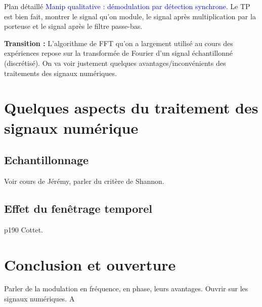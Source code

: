 \begin{reportBlock}{Plan détaillé}
\textcolor{blue}{Manip qualitative : démodulation par détection synchrone}. Le TP est bien fait, montrer le signal qu'on module, le signal après multiplication par la porteuse et le signal après le filtre passe-bas.

\textbf{Transition : }L'algorithme de FFT qu'on a largement utilisé au cours des expériences repose sur la transformée de Fourier d'un signal échantillonné (discrétisé). On va voir justement quelques avantages/inconvénients des traitements des signaux numériques.

\section{Quelques aspects du traitement des signaux numérique}

\subsection{Echantillonnage}
Voir cours de Jérémy, parler du critère de Shannon.

\subsection{Effet du fenêtrage temporel}
p190 Cottet.
\section*{Conclusion et ouverture}

Parler de la modulation en fréquence, en phase, leurs avantages. Ouvrir sur les signaux numériques. A



\end{reportBlock}